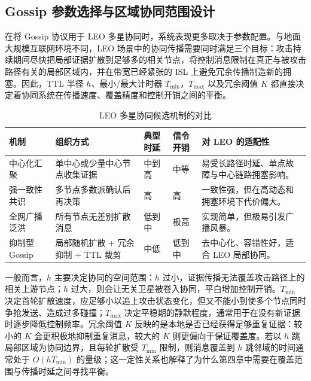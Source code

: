 \subsection{Gossip 参数选择与区域协同范围设计}

在将 Gossip 协议用于 LEO 多星协同时，系统表现更多取决于参数配置。与地面大规模互联网环境不同，LEO 场景中的协同传播需要同时满足三个目标：攻击持续期间尽快把局部证据扩散到足够多的相关节点，将控制消息限制在真正与被攻击路径有关的局部区域内，并在带宽已经紧张的 ISL 上避免冗余传播制造新的拥塞。因此，TTL 半径 $h$、最小/最大计时器 $T_{\min}，T_{\max}$ 以及冗余阈值 $K$ 都直接决定着协同系统在传播速度、覆盖精度和控制开销之间的平衡。

\begin{table}[t]
\centering
\caption{LEO 多星协同候选机制的对比}
\label{tab:ch2_collaboration_compare}
\small
\begin{tabular}{@{}
>{\raggedright\arraybackslash}p{2.2cm}
>{\raggedright\arraybackslash}p{2.3cm}
>{\raggedright\arraybackslash}p{2.1cm}
>{\raggedright\arraybackslash}p{2.1cm}
>{\raggedright\arraybackslash}p{3.2cm}
@{}}
\toprule
\textbf{机制} & \textbf{组织方式} & \textbf{典型时延} & \textbf{信令开销} & \textbf{对 LEO 的适配性} \\
\midrule
中心化汇聚 & 单中心或少量中心节点收集证据 & 中到高 & 中等 & 易受长路径时延、单点故障与中心链路拥塞影响。 \\
\midrule
强一致性共识 & 多节点多数派确认后再决策 & 高 & 高 & 一致性强，但在高动态和拥塞环境下代价偏大。 \\
\midrule
全网广播泛洪 & 所有节点无差别扩散消息 & 低到中 & 极高 & 实现简单，但极易引发广播风暴。 \\
\midrule
抑制型 Gossip & 局部随机扩散 + 冗余抑制 + TTL 裁剪 & 中低 & 低到中 & 去中心化、容错性好，适合 LEO 局部协同。 \\
\bottomrule
\end{tabular}
\end{table}

一般而言，$h$ 主要决定协同的空间范围：$h$ 过小，证据传播无法覆盖攻击路径上的相关上游节点；$h$ 过大，则会让无关卫星被卷入协同，平白增加控制开销。$T_{\min}$ 决定首轮扩散速度，应足够小以追上攻击状态变化，但又不能小到使多个节点同时争抢发送、造成过多碰撞；$T_{\max}$ 决定平稳期的静默程度，通常用于在没有新证据时逐步降低控制频率。冗余阈值 $K$ 反映的是本地是否已经获得足够重复证据：较小的 $K$ 会更积极地抑制重复消息，较大的 $K$ 则更偏向于保证覆盖度。若以 $h$ 跳局部区域为协同边界，且每轮扩散受 $T_{\min}$ 限制，则消息覆盖到 $h$ 跳邻域的时间通常处于 $O(hT_{\min})$ 的量级；这一定性关系也解释了为什么第四章中需要在覆盖范围与传播时延之间寻找平衡。


